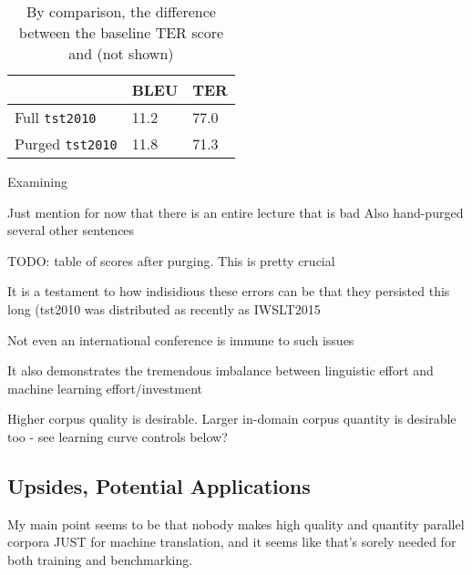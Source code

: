 \begin{table}[]
\centering
\label{table:tst2010}
\begin{tabular}{|l|l|l|}
\hline
 & BLEU & TER  \\ \hline
Full {\small \tt tst2010} & 11.2 & 77.0  \\ \hline
Purged {\small \tt tst2010} & 11.8 & 71.3  \\ \hline
\end{tabular}
\caption{By comparison, the difference between the baseline TER score and (not shown) } %
\end{table}















Examining 


Just mention for now that there is an entire lecture that is bad
Also hand-purged several other sentences

TODO: table of scores after purging. This is pretty crucial





It is a testament to how indisidious these errors can be that they persisted this long (tst2010 was distributed as recently as IWSLT2015

Not even an international conference is immune to such issues

It also demonstrates the tremendous imbalance between linguistic effort and machine learning effort/investment




Higher corpus quality is desirable.
Larger in-domain corpus quantity is desirable too - see learning curve controls below?


\subsection{Upsides, Potential Applications}


My main point seems to be that nobody makes high quality and quantity parallel corpora JUST for machine translation, and it seems like that's sorely needed for both training and benchmarking.

